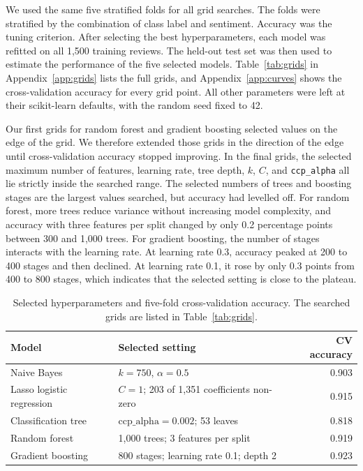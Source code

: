 \documentclass[onecolumn]{jmlr}
\begin{document}
We used the same five stratified folds for all grid searches. The folds were stratified by the combination of class label and sentiment. Accuracy was the tuning criterion. After selecting the best hyperparameters, each model was refitted on all 1,500 training reviews. The held-out test set was then used to estimate the performance of the five selected models. Table~\ref{tab:grids} in Appendix~\ref{app:grids} lists the full grids, and Appendix~\ref{app:curves} shows the cross-validation accuracy for every grid point. All other parameters were left at their scikit-learn defaults, with the random seed fixed to 42.

Our first grids for random forest and gradient boosting selected values on the edge of the grid. We therefore extended those grids in the direction of the edge until cross-validation accuracy stopped improving. In the final grids, the selected maximum number of features, learning rate, tree depth, $k$, $C$, and \texttt{ccp\_alpha} all lie strictly inside the searched range. The selected numbers of trees and boosting stages are the largest values searched, but accuracy had levelled off. For random forest, more trees reduce variance without increasing model complexity, and accuracy with three features per split changed by only 0.2 percentage points between 300 and 1,000 trees. For gradient boosting, the number of stages interacts with the learning rate. At learning rate 0.3, accuracy peaked at 200 to 400 stages and then declined. At learning rate 0.1, it rose by only 0.3 points from 400 to 800 stages, which indicates that the selected setting is close to the plateau.

\begin{table}[ht]
\centering
\caption{Selected hyperparameters and five-fold cross-validation accuracy. The searched grids are listed in Table~\ref{tab:grids}.}
\label{tab:tuning}
\small
\begin{tabular}{p{2.4cm}p{7.0cm}r}
\toprule
Model & Selected setting & CV accuracy \\
\midrule
Naive Bayes & $k=750$, $\alpha=0.5$ & 0.903 \\
Lasso logistic regression & $C=1$; 203 of 1,351 coefficients non-zero & 0.915 \\
Classification tree & $\mathrm{ccp\_alpha}=0.002$; 53 leaves & 0.818 \\
Random forest & 1,000 trees; 3 features per split & 0.919 \\
Gradient boosting & 800 stages; learning rate 0.1; depth 2 & 0.923 \\
\bottomrule
\end{tabular}
\end{table}
\end{document}
